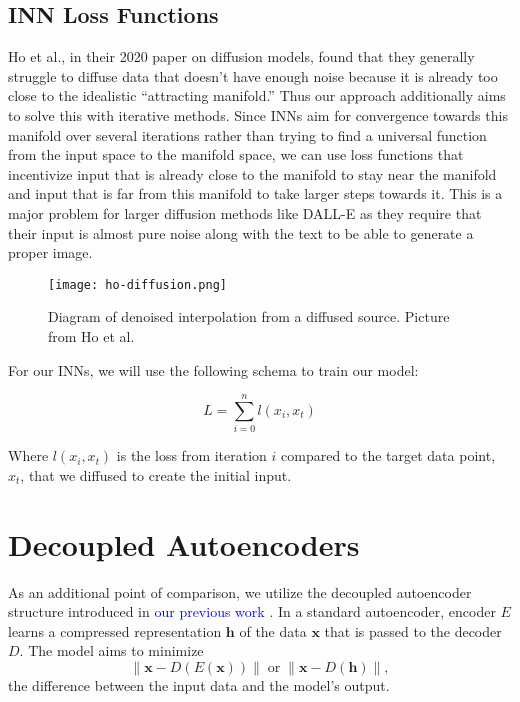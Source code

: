 \documentclass[sigconf]{acmart}
\begin{document}
\subsection{INN Loss Functions}

Ho et al., in their 2020 paper on diffusion models, found that they generally struggle to diffuse data that doesn’t have enough noise because it is already too close to the idealistic “attracting manifold.” Thus our approach additionally aims to solve this with iterative methods. Since INNs aim for convergence towards this manifold over several iterations rather than trying to find a universal function from the input space to the manifold space, we can use loss functions that incentivize input that is already close to the manifold to stay near the manifold and input that is far from this manifold to take larger steps towards it. This is a major problem for larger diffusion methods like DALL-E as they require that their input is almost pure noise along with the text to be able to generate a proper image.\cite{ho2020denoising}\cite{ramesh2021zero}

\begin{figure}[h]
    \centering
    \texttt{[image: ho-diffusion.png]}
    \caption{Diagram of denoised interpolation from a diffused source. Picture from Ho et al.\cite{ho2020denoising}}
    \label{fig:enter-label}
\end{figure}

For our INNs, we will use the following schema to train our model:

\begin{equation}
    L = \sum_{i=0}^n l(x_i, x_t)
\end{equation}

Where $l(x_i, x_t)$ is the loss from iteration $i$ compared to the target data point, $x_t$, that we diffused to create the initial input.

\section{Decoupled Autoencoders}
As an additional point of comparison, we utilize the decoupled autoencoder structure introduced in \textcolor{blue}{our previous work} \cite{dunham2024oracle}. 
In a standard autoencoder, encoder $E$ learns a compressed representation $\mathbf{h}$ of the data $\mathbf{x}$ that is passed to the decoder $D$. The model aims to minimize
$$\| \mathbf{x} - D(E( \mathbf{x} ))\| \; \text{or} \; \| \mathbf{x} - D(\mathbf{h})\|,$$ 
the difference between the input data and the model's output.
\end{document}

